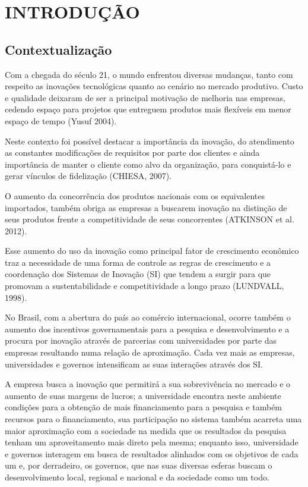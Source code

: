 \chapter{INTRODUÇÃO}
\thispagestyle{empty}

\section{Contextualização}
Com a chegada do século 21, o mundo enfrentou diversas mudanças, tanto com respeito as inovações tecnológicas quanto ao cenário no mercado produtivo. Custo e qualidade deixaram de ser a principal motivação de melhoria nas empresas, cedendo espaço para projetos que entreguem produtos mais flexíveis em menor espaço de tempo (Yusuf 2004).

Neste contexto foi possível destacar a importância da inovação, do atendimento as constantes modificações de requisitos por parte dos clientes e ainda importância de manter o cliente como alvo da organização, para conquistá-lo e gerar vínculos de fidelização (CHIESA, 2007).

O aumento da concorrência dos produtos nacionais com os equivalentes importados, também obriga as empresas a buscarem inovação na distinção de seus produtos frente a competitividade de seus concorrentes (ATKINSON et al. 2012).

Esse aumento do uso da inovação como principal fator de crescimento econômico traz a necessidade de uma forma de controle as regras de crescimento e a coordenação dos Sistemas de Inovação (SI) que tendem a surgir para que promovam a sustentabilidade e competitividade a longo prazo (LUNDVALL, 1998).

No Brasil, com a abertura do país ao comércio internacional, ocorre também o aumento dos incentivos governamentais para a pesquisa e desenvolvimento e a procura por inovação através de parcerias com universidades por parte das empresas resultando numa relação de aproximação. Cada vez mais as empresas, universidades e governos intensificam as suas interações através dos SI.

A empresa busca a inovação que permitirá a sua sobrevivência no mercado e o aumento de suas margens de lucros; a universidade encontra neste ambiente condições para a obtenção de mais financiamento para a pesquisa e também recursos para o financiamento, sua participação no sistema também acarreta uma maior aproximação com a sociedade na medida que os resultados da pesquisa tenham um aproveitamento mais direto pela mesma; enquanto isso, universidade e governos interagem em busca de resultados alinhados com os objetivos de cada um e, por derradeiro, os governos, que nas suas diversas esferas buscam o desenvolvimento local, regional e nacional e da sociedade como um todo.


